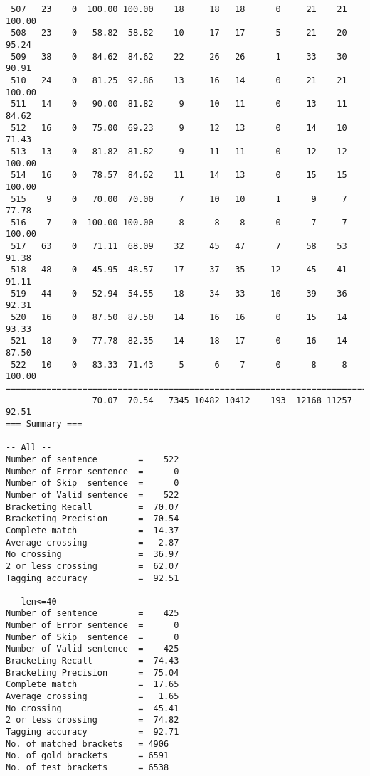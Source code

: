 \begin{verbatim}
 507   23    0  100.00 100.00    18     18   18      0     21    21   100.00
 508   23    0   58.82  58.82    10     17   17      5     21    20    95.24
 509   38    0   84.62  84.62    22     26   26      1     33    30    90.91
 510   24    0   81.25  92.86    13     16   14      0     21    21   100.00
 511   14    0   90.00  81.82     9     10   11      0     13    11    84.62
 512   16    0   75.00  69.23     9     12   13      0     14    10    71.43
 513   13    0   81.82  81.82     9     11   11      0     12    12   100.00
 514   16    0   78.57  84.62    11     14   13      0     15    15   100.00
 515    9    0   70.00  70.00     7     10   10      1      9     7    77.78
 516    7    0  100.00 100.00     8      8    8      0      7     7   100.00
 517   63    0   71.11  68.09    32     45   47      7     58    53    91.38
 518   48    0   45.95  48.57    17     37   35     12     45    41    91.11
 519   44    0   52.94  54.55    18     34   33     10     39    36    92.31
 520   16    0   87.50  87.50    14     16   16      0     15    14    93.33
 521   18    0   77.78  82.35    14     18   17      0     16    14    87.50
 522   10    0   83.33  71.43     5      6    7      0      8     8   100.00
============================================================================
                 70.07  70.54   7345 10482 10412    193  12168 11257    92.51
=== Summary ===

-- All --
Number of sentence        =    522
Number of Error sentence  =      0
Number of Skip  sentence  =      0
Number of Valid sentence  =    522
Bracketing Recall         =  70.07
Bracketing Precision      =  70.54
Complete match            =  14.37
Average crossing          =   2.87
No crossing               =  36.97
2 or less crossing        =  62.07
Tagging accuracy          =  92.51

-- len<=40 --
Number of sentence        =    425
Number of Error sentence  =      0
Number of Skip  sentence  =      0
Number of Valid sentence  =    425
Bracketing Recall         =  74.43
Bracketing Precision      =  75.04
Complete match            =  17.65
Average crossing          =   1.65
No crossing               =  45.41
2 or less crossing        =  74.82
Tagging accuracy          =  92.71
No. of matched brackets   = 4906
No. of gold brackets      = 6591
No. of test brackets      = 6538

\end{verbatim}

\normalsize

